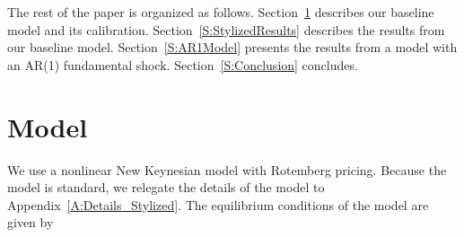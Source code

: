 \documentclass[11pt]{article}
\begin{document}
	The rest of the paper is organized as follows. Section~\ref{S:StylizedModel} describes our baseline model and its calibration. Section~\ref{S:StylizedResults} describes the results from our baseline model. Section~\ref{S:AR1Model} presents the results from a model with an AR(1) fundamental shock.  Section~\ref{S:Conclusion} concludes.



	\section{Model}
	\label{S:StylizedModel}

	We use a nonlinear New Keynesian model with Rotemberg pricing. Because the model is standard, we relegate the details of the model to Appendix~\ref{A:Details_Stylized}. The equilibrium conditions of the model are given by
\end{document}
